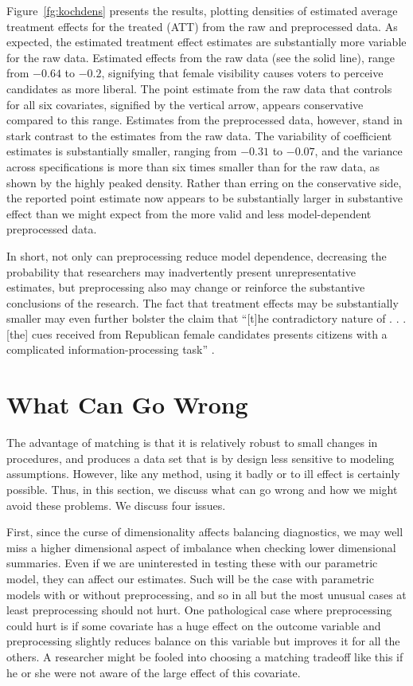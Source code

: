 \documentclass[11pt,titlepage]{article}
\begin{document}
Figure~\ref{fg:kochdens} presents the results, plotting densities of
estimated average treatment effects for the treated (ATT) from the raw
and preprocessed data.  As expected, the estimated treatment effect
estimates are substantially more variable for the raw data.  Estimated
effects from the raw data (see the solid line), range from $-0.64$ to
$-0.2$, signifying that female visibility causes voters to perceive
candidates as more liberal.  The point estimate from the raw data that
controls for all six covariates, signified by the vertical arrow,
appears conservative compared to this range.  Estimates from the
preprocessed data, however, stand in stark contrast to the estimates
from the raw data.  The variability of coefficient estimates is
substantially smaller, ranging from $-0.31$ to $-0.07$, and the
variance across specifications is more than six times smaller than for
the raw data, as shown by the highly peaked density.  Rather than
erring on the conservative side, the reported point estimate now
appears to be substantially larger in substantive effect than we might
expect from the more valid and less model-dependent preprocessed data.

In short, not only can preprocessing reduce model dependence,
decreasing the probability that researchers may inadvertently present
unrepresentative estimates, but preprocessing also may change or
reinforce the substantive conclusions of the research.  The fact that
treatment effects may be substantially smaller may even further
bolster the claim that ``[t]he contradictory nature of . . . [the]
cues received from Republican female candidates presents citizens with
a complicated information-processing task'' \citep[p. 460]{Koch02}.

\section{What Can Go Wrong}

The advantage of matching is that it is relatively robust to small
changes in procedures, and produces a data set that is by design less
sensitive to modeling assumptions.  However, like any method, using it
badly or to ill effect is certainly possible.  Thus, in this section,
we discuss what can go wrong and how we might avoid these problems.
We discuss four issues.

First, since the curse of dimensionality affects balancing
diagnostics, we may well miss a higher dimensional aspect of imbalance
when checking lower dimensional summaries.  Even if we are
uninterested in testing these with our parametric model, they can
affect our estimates.  Such will be the case with parametric models
with or without preprocessing, and so in all but the most unusual
cases at least preprocessing should not hurt.  One pathological case
where preprocessing could hurt is if some covariate has a huge effect
on the outcome variable and preprocessing slightly reduces balance on
this variable but improves it for all the others.  A researcher might
be fooled into choosing a matching tradeoff like this if he or she
were not aware of the large effect of this covariate.
\end{document}
